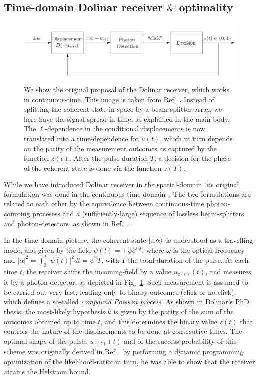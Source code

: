 \subsection{Time-domain Dolinar receiver $\&$ optimality}\label{ssec:tdol}
\begin{figure}[t!]
    \centering
    \includegraphics[width=1.\textwidth]{Figures/dolianr_cont.png}
    \caption{We show the original proposal of the Dolinar receiver, which works in continuous-time. This image is taken from Ref.~\cite{revisiting2011Assalini}. Instead of splitting the coherent-state in space by a beam-splitter array, we here have the signal spread in time, as explained in the main-body. The $\ell$-dependence in the conditional displacements is now translated into a time-dependence for $u(t)$, which in turn depends on the parity of the measurement outcomes as captured by the function $z(t)$. After the pulse-duration $T$, a decision for the phase of the coherent state is done via the function $z(T)$.}
    \label{fig:dolinar_cont}
\end{figure}
While we have introduced Dolinar receiver in the spatial-domain, its original formulation was done in the continuous-time domain~\cite{Dolinar}. The two formulations are related to each other by the equivalence between continuous-time photon-counting procesess and a (sufficiently-large) sequence of lossless beam-splitters and photon-detectors, as shown in Ref.~\cite{quasicontinuous}.

In the time-domain picture, the coherent state $\ket{\pm \alpha}$ is understood as a travelling-mode, and given by the field $\psi(t) = \pm \psi e^{\ii \omega t}$, where $\omega$ is the optical frequency and $|\alpha|^2 = \int_0^T |\psi(t)|^2dt = \psi^2 T$, with $T$ the total duration of the pulse. At each time $t$, the receiver shifts the incoming-field by a value $u_{z(t)}(t)$, and measures it by a photon-detector, as depicted in Fig.~\ref{fig:dolinar_cont}. Such measurement is assumed to be carried out very fast, leading only to binary outcomes (click or no click), which defines a so-called
\textit{compound Poisson process}. As shown in Dolinar's PhD thesis, the most-likely hypothesis $k$ is given by the parity of the sum of the outcomes obtained up to time $t$, and this determines the binary value $z(t)$ that controls the nature of the displacements to be done at consecutive times. The optimal shape of the pulses $u_{z(t)}(t)$ and of the success-probability of this scheme was originally derived in Ref.~\cite{Dolinar} by performing a dynamic programming optimization of the likelihood-ratio; in turn, he was able to show that the receiver attains the Helstrom bound. %

